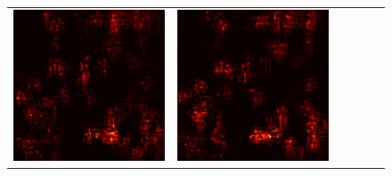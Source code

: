 \documentclass[preprint,12pt]{elsarticle}
\begin{document}
\begin{figure}[p]
\begin{tabular}{cccccc}
  \includegraphics[scale=\scale]{../visualizations/examples/imagenette/cnn/active_saliency_map/4.png} & 
  \includegraphics[scale=\scale]{../visualizations/examples/imagenette/cnn/inactive_saliency_map/4.png} \\
  

\end{tabular}
\end{figure}
\end{document}
